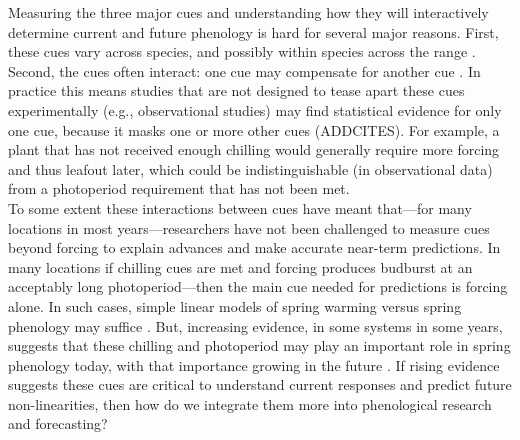 
Measuring the three major cues and understanding how they will interactively determine current and future phenology is hard for several major reasons. First, these cues vary across species, and possibly within species across the range  \citep{vitasse2009,harrington2015}. Second, the cues often interact: one cue may compensate for another cue \citep{Chuine2000}. In practice this means studies that are not designed to tease apart these cues experimentally (e.g., observational studies) may find statistical evidence for only one cue, because it masks one or more other cues (ADDCITES). For example, a plant that has not received enough chilling would generally require more forcing and thus leafout later, which could be indistinguishable (in observational data) from a photoperiod requirement that has not been met. \\

To some extent these interactions between cues have meant that---for many locations in most years---researchers have not been challenged to measure cues beyond forcing to explain advances and make accurate near-term predictions. In many locations if chilling cues are met and forcing produces budburst at an acceptably long photoperiod---then the main cue needed for predictions is forcing alone. In such cases, simple linear models of spring warming versus spring phenology may suffice \citep[e.g.,]{Ellwood2012}. But, increasing evidence, in some systems in some years, suggests that these chilling and photoperiod may play an important role in spring phenology today, with that importance growing in the future \citep{chuine2016,gauzere2019}. If rising evidence suggests these cues are critical to understand current responses and predict future non-linearities, then how do we integrate them more into phenological research and forecasting? \\%

